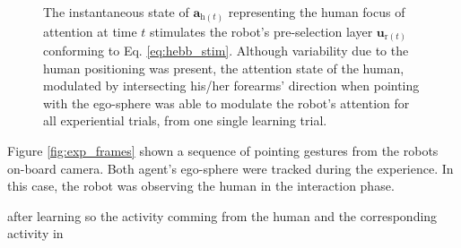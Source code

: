 \documentclass[letterpaper, 10 pt, conference]{ieeeconf}  %
\begin{document}
\begin{figure}[h!]
\begin{center}
	\end{center}
	\caption{The instantaneous state of $\mathbf{a}_{\mathrm{h}(t)}$ representing the human focus of attention at time $t$ stimulates the robot's pre-selection layer $\mathbf{u}_{\mathrm{r}(t)}$ conforming to Eq. \eqref{eq:hebb_stim}. Although variability due to the human positioning was present, the attention state of the human, modulated by intersecting his/her forearms' direction when pointing with the ego-sphere was able to modulate the robot's attention for all experiential trials, from one single learning trial.}
	\label{fig:exp_hebb}
\end{figure}

Figure \ref{fig:exp_frames} shown a sequence of pointing gestures from the robots on-board camera. Both agent's ego-sphere were tracked during the experience. In this case, the robot was observing the human in the interaction phase. 

after learning so the activity comming from the human  and the corresponding activity in  
\end{document}
